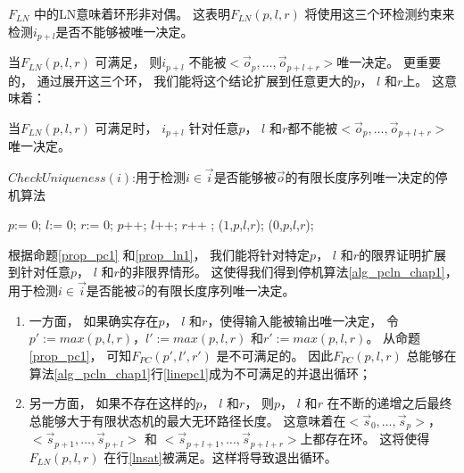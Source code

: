 $F_{LN}$ 中的LN意味着环形非对偶。
这表明$F_{LN}(p,l,r)$ 将使用这三个环检测约束来检测$i_{p+l}$是否不能够被唯一决定。

当$F_{LN}(p,l,r)$ 可满足，
则$i_{p+l}$ 不能被$<\vec{o}_{p},\dots,\vec{o}_{p+l+r}>$唯一决定。
更重要的，
通过展开这三个环，
我们能将这个结论扩展到任意更大的$p$， $l$ 和$r$上。
这意味着：

\begin{proposition}\label{prop_ln1}
当$F_{LN}(p,l,r)$ 可满足时，
$i_{p+l}$ 针对任意$p$， $l$ 和$r$都不能被$<\vec{o}_{p},\dots,\vec{o}_{p+l+r}>$ 唯一决定。
\end{proposition}



\begin{algorithm}[t]
\caption{$CheckUniqueness(i)$:用于检测$i\in\vec{i}$是否能够被$\vec{o}$的有限长度序列唯一决定的停机算法}
\label{alg_pcln_chap1}
\begin{algorithmic}[1]
\STATE $p$:= 0;
\STATE $l$:= 0;
\STATE $r$:= 0;
\STATE $p$++;
\STATE $l$++;
\STATE $r$++ ;
\label{linepc1}
\RETURN ($1$,$p$,$l$,$r$)\label{lineln1};
\label{lnsat}
\RETURN ($0$,$p$,$l$,$r$);
\ENDIF
\ENDWHILE
\end{algorithmic}
\end{algorithm}

%




根据命题\ref{prop_pc1} 和\ref{prop_ln1}，
我们能将针对特定$p$， $l$ 和$r$的限界证明扩展到针对任意$p$， $l$ 和$r$的非限界情形。
这使得我们得到停机算法\ref{alg_pcln_chap1}，
用于检测$i\in\vec{i}$是否能被$\vec{o}$的有限长度序列唯一决定。
\begin{enumerate}
 \item
一方面，
如果确实存在$p$， $l$ 和$r$，使得输入能被输出唯一决定，
令$p':=max(p,l,r)$，$l':=max(p,l,r)$ 和$r':=max(p,l,r)$。
从命题\ref{prop_pc1}，
可知$F_{PC}(p',l',r')$ 是不可满足的。
因此$F_{PC}(p,l,r)$ 总能够在算法\ref{alg_pcln_chap1}行\ref{linepc1}成为不可满足的并退出循环；
 \item
另一方面，
如果不存在这样的$p$， $l$ 和$r$，
则$p$， $l$ 和$r$ 在不断的递增之后最终总能够大于有限状态机的最大无环路径长度。
这意味着在$<\vec{s}_{0},\dots,\vec{s}_{p}>$，$<\vec{s}_{p+1},\dots,\vec{s}_{p+l}>$ 和
$<\vec{s}_{p+l+1},\dots,\vec{s}_{p+l+r}>$上都存在环。
这将使得$F_{LN}(p,l,r)$ 在行\ref{lnsat}被满足。这样将导致退出循环。
\end{enumerate}


